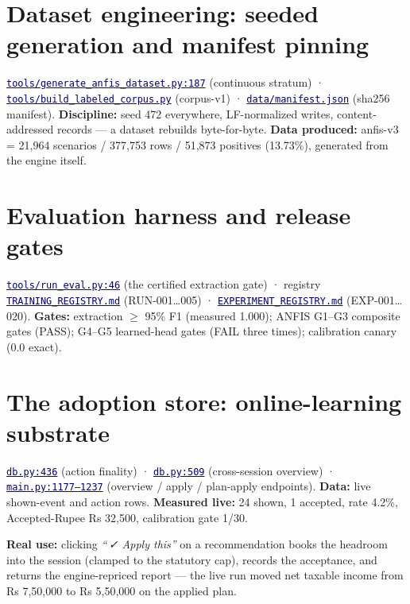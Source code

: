 \documentclass[11pt,a4paper]{article}
\newcommand{\code}[2]{\href{https://github.com/Jayant1711/Tax_Assist-system/blob/v0.7-sprint7/#1}{\texttt{\textcolor{navy}{#2}}}}
\newcommand{\facts}[1]{{\small\textcolor{muted}{#1}\par}}
\begin{document}
\section{Dataset engineering: seeded generation and manifest pinning}
\facts{\code{backend/tools/generate\_anfis\_dataset.py}{tools/generate\_anfis\_dataset.py:187}
(continuous stratum) · \code{backend/tools/build\_labeled\_corpus.py}{tools/build\_labeled\_corpus.py}
(corpus-v1) · \code{backend/data/manifest.json}{data/manifest.json} (sha256
manifest). \textbf{Discipline:} seed 472 everywhere, LF-normalized writes,
content-addressed records --- a dataset rebuilds byte-for-byte. \textbf{Data
produced:} anfis-v3 = 21,964 scenarios / 377,753 rows / 51,873 positives
(13.73\%), generated from the engine itself.}

\section{Evaluation harness and release gates}
\facts{\code{backend/tools/run\_eval.py}{tools/run\_eval.py:46} (the certified
extraction gate) · registry \code{TRAINING\_REGISTRY.md}{TRAINING\_REGISTRY.md}
(RUN-001\ldots005) · \code{EXPERIMENT\_REGISTRY.md}{EXPERIMENT\_REGISTRY.md}
(EXP-001\ldots020). \textbf{Gates:} extraction $\geq$ 95\% F1 (measured 1.000);
ANFIS G1--G3 composite gates (PASS); G4--G5 learned-head gates (FAIL three
times); calibration canary (0.0 exact).}

\section{The adoption store: online-learning substrate}
\facts{\code{backend/db.py}{db.py:436} (action finality) ·
\code{backend/db.py}{db.py:509} (cross-session overview) ·
\code{backend/main.py}{main.py:1177--1237} (overview / apply / plan-apply
endpoints). \textbf{Data:} live shown-event and action rows. \textbf{Measured
live:} 24 shown, 1 accepted, rate 4.2\%, Accepted-Rupee Rs 32,500, calibration
gate 1/30.}

\begin{examplebox}
\textbf{Real use:} clicking \emph{``\,✓ Apply this''} on a recommendation books
the headroom into the session (clamped to the statutory cap), records the
acceptance, and returns the engine-repriced report --- the live run moved net
taxable income from Rs 7,50,000 to Rs 5,50,000 on the applied plan.
\end{examplebox}
\end{document}
